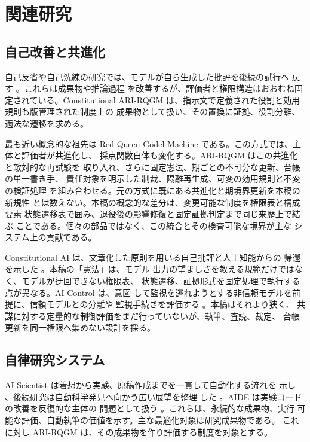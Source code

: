 \section{関連研究}\label{sec:related}

\subsection{自己改善と共進化}\label{sec:related:treesearch}

自己反省や自己洗練の研究では、モデルが自ら生成した批評を後続の試行へ
戻す \cite{madaan2023self,shinn2023reflexion}。これらは成果物や推論過程
を改善するが、評価者と権限構造はおおむね固定されている。Constitutional
ARI-RQGM は、指示文で定義された役割と効用規則も版管理された制度上の
成果物として扱い、その置換に証拠、役割分離、適法な遷移を求める。

最も近い概念的な祖先は Red Queen G\"odel Machine
\cite{iacob2026red} である。この方式では、主体と評価者が共進化し、
採点関数自体も変化する。ARI-RQGM はこの共進化と敵対的な再試験を
取り入れ、さらに固定憲法、期ごとの不可分な更新、台帳の単一書き手、
責任対象を明示した制裁、隔離再生成、可変の効用規則と不変の検証処理
を組み合わせる。元の方式に既にある共進化と期境界更新を本稿の新規性
とは数えない。本稿の概念的な差分は、変更可能な制度を権限表と構成要素
状態遷移表で囲み、退役後の影響修復と固定証拠判定まで同じ来歴上で結ぶ
ことである。個々の部品ではなく、この統合とその検査可能な境界が主な
システム上の貢献である。

Constitutional AI は、文章化した原則を用いる自己批評と人工知能からの
帰還を示した \cite{bai2022constitutional}。本稿の「憲法」は、モデル
出力の望ましさを教える規範だけではなく、モデルが迂回できない権限表、
状態遷移、証拠形式を固定処理で執行する点が異なる。AI Control は、意図
して監視を逃れようとする非信頼モデルを前提に、信頼モデルとの分離や
監視手続きを評価する \cite{greenblatt2023ai}。本稿はそれより狭く、
共謀に対する定量的な制御評価をまだ行っていないが、執筆、査読、裁定、
台帳更新を同一権限へ集めない設計を採る。

\subsection{自律研究システム}\label{sec:related:autonomous}

AI Scientist は着想から実験、原稿作成までを一貫して自動化する流れを
示し \cite{lu2024ai}、後続研究は自動科学発見へ向かう広い展望を整理
した \cite{lu2026towards}。AIDE は実験コードの改善を反復的な主体の
問題として扱う \cite{jiang2025aide}。これらは、永続的な成果物、実行
可能な評価、自動執筆の価値を示す。主な最適化対象は研究成果物である。
これに対し ARI-RQGM は、その成果物を作り評価する制度を対象とする。


